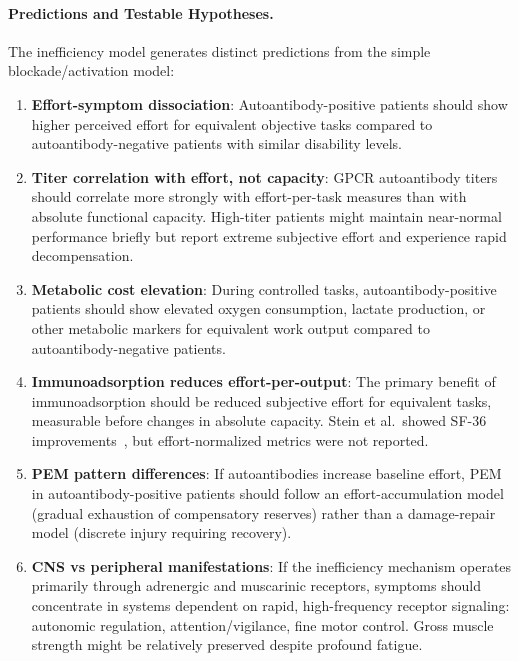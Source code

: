 \begin{speculation}
\paragraph{Predictions and Testable Hypotheses.}

The inefficiency model generates distinct predictions from the simple blockade/activation model:

\begin{enumerate}
    \item \textbf{Effort-symptom dissociation}: Autoantibody-positive patients should show higher perceived effort for equivalent objective tasks compared to autoantibody-negative patients with similar disability levels.

    \item \textbf{Titer correlation with effort, not capacity}: GPCR autoantibody titers should correlate more strongly with effort-per-task measures than with absolute functional capacity. High-titer patients might maintain near-normal performance briefly but report extreme subjective effort and experience rapid decompensation.

    \item \textbf{Metabolic cost elevation}: During controlled tasks, autoantibody-positive patients should show elevated oxygen consumption, lactate production, or other metabolic markers for equivalent work output compared to autoantibody-negative patients.

    \item \textbf{Immunoadsorption reduces effort-per-output}: The primary benefit of immunoadsorption should be reduced subjective effort for equivalent tasks, measurable before changes in absolute capacity. Stein et al.\ showed SF-36 improvements~\cite{Stein2024immunoadsorption}, but effort-normalized metrics were not reported.

    \item \textbf{PEM pattern differences}: If autoantibodies increase baseline effort, PEM in autoantibody-positive patients should follow an effort-accumulation model (gradual exhaustion of compensatory reserves) rather than a damage-repair model (discrete injury requiring recovery).

    \item \textbf{CNS vs peripheral manifestations}: If the inefficiency mechanism operates primarily through adrenergic and muscarinic receptors, symptoms should concentrate in systems dependent on rapid, high-frequency receptor signaling: autonomic regulation, attention/vigilance, fine motor control. Gross muscle strength might be relatively preserved despite profound fatigue.
\end{enumerate}


\end{speculation}

